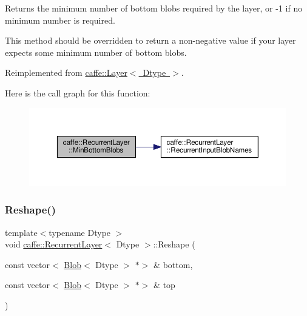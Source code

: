 Returns the minimum number of bottom blobs required by the layer, or -\/1 if no minimum number is required. 

This method should be overridden to return a non-\/negative value if your layer expects some minimum number of bottom blobs. 

Reimplemented from \mbox{\hyperlink{classcaffe_1_1_layer_aca3cb2bafaefda5d4760aaebd0b72def}{caffe\+::\+Layer$<$ Dtype $>$}}.

Here is the call graph for this function\+:
\nopagebreak
\begin{figure}[H]
\begin{center}
\leavevmode
\includegraphics[width=350pt]{classcaffe_1_1_recurrent_layer_ac31b705bc02d333ae768f7c2184fbfae_cgraph}
\end{center}
\end{figure}
\mbox{\label{classcaffe_1_1_recurrent_layer_aba6011a9cbb18e38a8596aa5dbb44723}} 
\subsubsection{\texorpdfstring{Reshape()}{Reshape()}\hspace{0.1cm}{\footnotesize\ttfamily [1/2]}}
{\footnotesize\ttfamily template$<$typename Dtype $>$ \\
void \mbox{\hyperlink{classcaffe_1_1_recurrent_layer}{caffe\+::\+Recurrent\+Layer}}$<$ Dtype $>$\+::Reshape (\begin{DoxyParamCaption}\item[{const vector$<$ \mbox{\hyperlink{classcaffe_1_1_blob}{Blob}}$<$ Dtype $>$ $\ast$$>$ \&}]{bottom,  }\item[{const vector$<$ \mbox{\hyperlink{classcaffe_1_1_blob}{Blob}}$<$ Dtype $>$ $\ast$$>$ \&}]{top }\end{DoxyParamCaption})\hspace{0.3cm}{\ttfamily [virtual]}}



